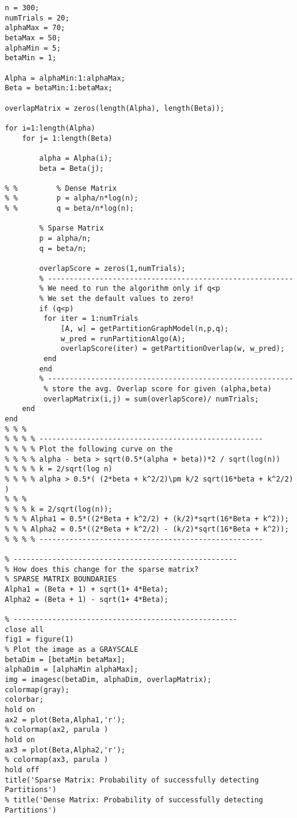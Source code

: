 \documentclass[9pt]{article}
\begin{document}
\begin{lstlisting}
n = 300;
numTrials = 20;
alphaMax = 70;
betaMax = 50;
alphaMin = 5;
betaMin = 1;

Alpha = alphaMin:1:alphaMax;
Beta = betaMin:1:betaMax;

overlapMatrix = zeros(length(Alpha), length(Beta));

for i=1:length(Alpha)
    for j= 1:length(Beta)
        
        alpha = Alpha(i);
        beta = Beta(j);
        
% %         % Dense Matrix
% %         p = alpha/n*log(n);
% %         q = beta/n*log(n);
         
        % Sparse Matrix
        p = alpha/n;
        q = beta/n;
        
        overlapScore = zeros(1,numTrials);
        % ---------------------------------------------------------
        % We need to run the algorithm only if q<p
        % We set the default values to zero!
        if (q<p)
         for iter = 1:numTrials
             [A, w] = getPartitionGraphModel(n,p,q);
             w_pred = runPartitionAlgo(A);
             overlapScore(iter) = getPartitionOverlap(w, w_pred);
         end 
        end
        % ---------------------------------------------------------
         % store the avg. Overlap score for given (alpha,beta)
         overlapMatrix(i,j) = sum(overlapScore)/ numTrials;
    end 
end
% % % 
% % % % ----------------------------------------------------
% % % % Plot the following curve on the 
% % % % alpha - beta > sqrt(0.5*(alpha + beta))*2 / sqrt(log(n))
% % % % k = 2/sqrt(log n)
% % % % alpha > 0.5*( (2*beta + k^2/2)\pm k/2 sqrt(16*beta + k^2/2)   )
% % % 
% % % k = 2/sqrt(log(n));
% % % Alpha1 = 0.5*((2*Beta + k^2/2) + (k/2)*sqrt(16*Beta + k^2));
% % % Alpha2 = 0.5*((2*Beta + k^2/2) - (k/2)*sqrt(16*Beta + k^2));
% % % % ----------------------------------------------------

% ----------------------------------------------------
% How does this change for the sparse matrix?
% SPARSE MATRIX BOUNDARIES
Alpha1 = (Beta + 1) + sqrt(1+ 4*Beta);
Alpha2 = (Beta + 1) - sqrt(1+ 4*Beta);

% ----------------------------------------------------
close all
fig1 = figure(1)
% Plot the image as a GRAYSCALE
betaDim = [betaMin betaMax];
alphaDim = [alphaMin alphaMax];
img = imagesc(betaDim, alphaDim, overlapMatrix);
colormap(gray);
colorbar;
hold on
ax2 = plot(Beta,Alpha1,'r');
% colormap(ax2, parula )
hold on
ax3 = plot(Beta,Alpha2,'r');
% colormap(ax3, parula )
hold off
title('Sparse Matrix: Probability of successfully detecting Partitions')
% title('Dense Matrix: Probability of successfully detecting Partitions')
\end{lstlisting}
\end{document}
